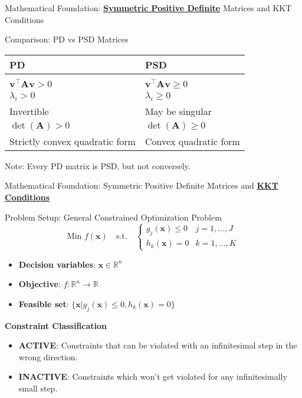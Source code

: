 \documentclass{beamer}
\begin{document}
\begin{frame}{Mathematical Foundation: \textbf{\underline{Symmetric Positive Definite}} Matrices and KKT Conditions}

\begin{alertblock}{Comparison: PD vs PSD Matrices}

\begin{tabular}{ll}
\textbf{PD} & \textbf{PSD} \\
\hline
\hfill \\
$\bm{v}^\top \bm{A} \bm{v} > 0$ & $\bm{v}^\top \bm{A} \bm{v} \geq 0$ \\
$\lambda_i > 0$ & $\lambda_i \geq 0$ \\
Invertible & May be singular \\
$\det(\bm{A}) > 0$ & $\det(\bm{A}) \geq 0$ \\
Strictly convex quadratic form & Convex quadratic form \\
\end{tabular}

\vspace{0.3cm}

Note: Every PD matrix is PSD, but not conversely.

\end{alertblock}

\end{frame}

\begin{frame}{{Mathematical Foundation: Symmetric Positive Definite Matrices and \textbf{\underline{KKT Conditions}}}}
    \begin{block}{Problem Setup: General Constrained Optimization Problem}
        \[
            \text{Min } f(\bm{x}) \quad \text{s.t.} \quad
            \begin{cases}
                g_j(\bm{x}) \leq 0 & j = 1,\ldots,J \\
                h_k(\bm{x}) = 0 & k = 1,\ldots,K
            \end{cases}
        \]

        \begin{itemize}
            \item \textbf{Decision variables}: $\bm{x} \in \mathbb{R}^n$
            \item \textbf{Objective}: $f: \mathbb{R}^n \rightarrow \mathbb{R}$
            \item \textbf{Feasible set}: $\{\bm{x} | g_j(\bm{x}) \leq 0, h_k(\bm{x}) = 0\}$
        \end{itemize}
    \end{block}

    \textbf{Constraint Classification}
    \begin{itemize}
        \item \textbf{ACTIVE}: Constraints that can be violated with an infinitesimal step in the wrong direction.
        \item \textbf{INACTIVE}: Constraints which won't get violated for any infinitesimally small step.
    \end{itemize}
\end{frame}
\end{document}
